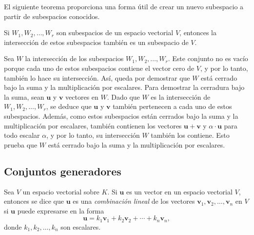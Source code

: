 El siguiente teorema proporciona una forma útil de crear un nuevo subespacio a partir de subespacios conocidos.

\begin{theorem}{}{}
    Si $W_1, W_2, \dots, W_r$ son subespacios de un espacio vectorial $V$, entonces la intersección de estos subespacios también es un subespacio de $V$.

    \tcblower
    \demostracion Sea $W$ la intersección de los subespacios $W_1, W_2, \dots, W_r$. Este conjunto no es vacío porque cada uno de estos subespacios contiene el vector cero de $V$, y por lo tanto, también lo hace su intersección. Así, queda por demostrar que $W$ está cerrado bajo la suma y la multiplicación por escalares. Para demostrar la cerradura bajo la suma, sean $\mathbf{u}$ y $\mathbf{v}$ vectores en $W$. Dado que $W$ es la intersección de $W_1, W_2, \dots, W_r$, se deduce que $\mathbf{u}$ y $\mathbf{v}$ también pertenecen a cada uno de estos subespacios. Además, como estos subespacios están cerrados bajo la suma y la multiplicación por escalares, también contienen los vectores $\mathbf{u} + \mathbf{v}$ y $\alpha \cdot \mathbf{u}$ para todo escalar $\alpha$, y por lo tanto, su intersección $W$ también los contiene. Esto prueba que $W$ está cerrado bajo la suma y la multiplicación por escalares.
\end{theorem}

\subsection{Conjuntos generadores}

\begin{definicion}{}{}
    Sea $V$ un espacio vectorial sobre $K$. Si $\mathbf{u}$ es un vector en un espacio vectorial $V$, entonces se dice que $\mathbf{u}$ es una \emph{combinación lineal} de los vectores $\mathbf{v}_1, \mathbf{v}_2, \dots, \mathbf{v}_n$ en $V$ si $\mathbf{u}$ puede expresarse en la forma
    $$\mathbf{u} = k_1 \mathbf{v}_1 + k_2 \mathbf{v}_2 + \cdots + k_n \mathbf{v}_n,$$
    donde $k_1, k_2, \dots, k_n$ son escalares.
\end{definicion}

